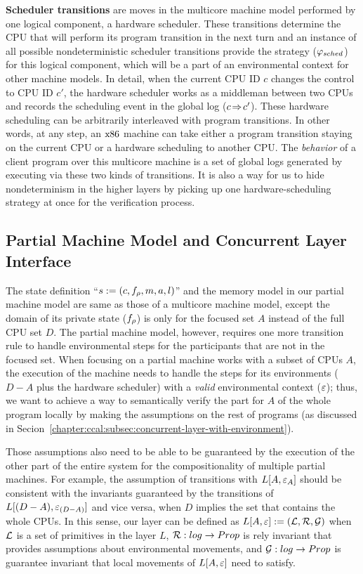 \textbf{Scheduler transitions} are moves in the multicore machine model performed by one logical component, a hardware scheduler.
 These transitions determine  the CPU that will perform its program transition 
in the next turn and 
an instance of all possible nondeterministic scheduler transitions provide 
the strategy   ($\varphi_{sched}$) for this logical component, 
which will be a part of an environmental context for other machine models. 
In detail, when the current CPU ID $c$ changes
the control to CPU ID $c'$,
the hardware scheduler works as a
middleman between 
two CPUs and records the scheduling event 
in the global log ($c \!\Rightarrow\! c'$).
These hardware scheduling
can be arbitrarily interleaved with
program transitions.
In other words, at any step,
an $\mathrm{x86}$ machine can take either a program transition staying
on the current CPU
or a hardware scheduling to another CPU.
The \emph{behavior} of a client program  over this multicore machine is a set of global logs generated by executing  via these two kinds of transitions.
It is also a way for us to hide nondeterminism in the higher layers
by picking up 
one hardware-scheduling strategy at once for the verification process.

\subsection{Partial  Machine Model and Concurrent Layer Interface}
\label{chapter:ccal:subsec:concurrent-layer-interface}


The state definition ``$s := (c, f_{\rho}, m, a, l)$'' and the memory model in our partial machine model are
same as those of a multicore machine model, 
except the domain of its private state ($f_{\rho}$) is only for the focused set $A$ instead of the full CPU set $D$.
The partial machine model, however, requires one more transition rule to handle environmental steps for the participants that are not in the focused set.
When focusing on a partial machine works with a subset of CPUs $A$,
the execution of the machine needs to handle 
the steps for its environments ($D - A$ plus the hardware scheduler) with a \textit{valid} environmental context (${\varepsilon}$);
thus, we want to  achieve a way to semantically verify the part for $A$ of the whole program locally
by making the assumptions on the rest of programs (as discussed in Secion~\ref{chapter:ccal:subsec:concurrent-layer-with-environment}).

Those assumptions  also need to be able to be guaranteed by the execution of the other part of the entire system for 
the compositionality of multiple partial machines.
For example, the assumption of transitions with $L[A, {\varepsilon}_{A}]$ should be consistent with the invariants guaranteed by the transitions of $L[(D - A), {\varepsilon}_{(D-A)}]$ and vice versa, when $D$ implies the set that contains the whole CPUs.
In this sense, our layer can be defined as
$L[A, {\varepsilon}] := (\mathcal{L}, \mathcal{R},\mathcal{G})$ when $\mathcal{L}$ is a set of primitives in the layer $L$,
$\mathcal{R} : log \rightarrow Prop$ is  rely invariant that provides assumptions about  environmental movements,
and $\mathcal{G}: log \rightarrow Prop$ is guarantee invariant that local movements of $L[A, {\varepsilon}]$ need to satisfy.

